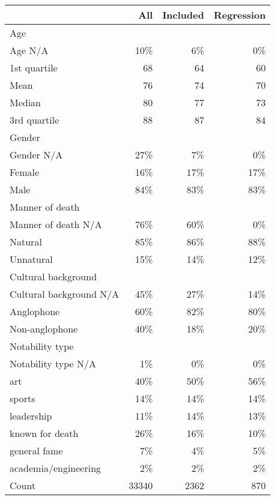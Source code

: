 \begin{tabular}{lrrr}
  \hline
 & All & Included & Regression \\ 
  \hline
Age &  &  &  \\ 
  Age N/A & 10\% & 6\% & 0\% \\ 
  1st quartile & 68 & 64 & 60 \\ 
  Mean & 76 & 74 & 70 \\ 
  Median & 80 & 77 & 73 \\ 
  3rd quartile & 88 & 87 & 84 \\ 
   \hline
Gender &  &  &  \\ 
  Gender N/A & 27\% & 7\% & 0\% \\ 
  Female & 16\% & 17\% & 17\% \\ 
  Male & 84\% & 83\% & 83\% \\ 
   \hline
Manner of death &  &  &  \\ 
  Manner of death N/A & 76\% & 60\% & 0\% \\ 
  Natural & 85\% & 86\% & 88\% \\ 
  Unnatural & 15\% & 14\% & 12\% \\ 
   \hline
Cultural background &  &  &  \\ 
  Cultural background N/A & 45\% & 27\% & 14\% \\ 
  Anglophone & 60\% & 82\% & 80\% \\ 
  Non-anglophone & 40\% & 18\% & 20\% \\ 
   \hline
Notability type &  &  &  \\ 
  Notability type N/A & 1\% & 0\% & 0\% \\ 
  art & 40\% & 50\% & 56\% \\ 
  sports & 14\% & 14\% & 14\% \\ 
  leadership & 11\% & 14\% & 13\% \\ 
  known for death & 26\% & 16\% & 10\% \\ 
  general fame & 7\% & 4\% & 5\% \\ 
  academia/engineering & 2\% & 2\% & 2\% \\ 
   \hline
Count & 33340 & 2362 & 870 \\ 
   \hline
\end{tabular}
